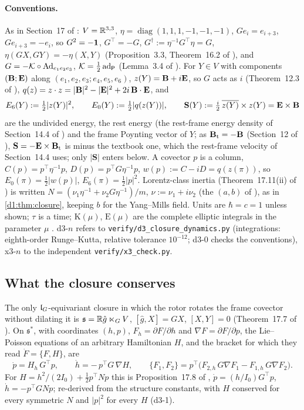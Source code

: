 \paragraph{Conventions.} As in Section~17 of \cite{ES17}: $V=\mathbb{R}^{3,3}$, $\eta=\operatorname{diag}(1,1,1,-1,-1,-1)$, $Ge_i=e_{i+3}$, $Ge_{i+3}=-e_i$,
so $G^2=-\mathbf 1$, $G^{\!\top}=-G$, $G^\dagger:=\eta^{-1}G^{\!\top}\eta=G$, $\eta(GX,GY)=-\eta(X,Y)$ (Proposition~3.3, Theorem~16.2 of \cite{ES17}), and
$G=-\mathcal K\circ\operatorname{Ad}_{e_1e_2e_3}$, $\mathcal K=\tfrac12\operatorname{ad}_{\mathsf P}$ (Lemma~3.4 of \cite{ES17}). For $Y\in V$ with components $(\mathbf B;\mathbf E)$ along
$(e_1,e_2,e_3;e_4,e_5,e_6)$, $z(Y)=\mathbf B+i\mathbf E$, so $G$ acts as $i$ (Theorem~12.3 of \cite{ES17}), $q(z)=z\cdot z=|\mathbf B|^2-|\mathbf E|^2+2i\,\mathbf B\cdot\mathbf E$, and
\[
E_6(Y):=\tfrac12|z(Y)|^2,\qquad E_0(Y):=\tfrac12|q(z(Y))|,\qquad \mathbf S(Y):=\tfrac i2\,\overline{z(Y)}\times z(Y)=\mathbf E\times\mathbf B
\]
are the undivided energy, the rest energy (the rest-frame energy density of Section~14.4 of \cite{ES17}) and the frame Poynting vector of $Y$; as
$\mathbf B_{\rm t}=-\mathbf B$ (Section~12 of \cite{ES17}), $\mathbf S=-\mathbf E\times\mathbf B_{\rm t}$ is minus the textbook one, which the rest-frame velocity of Section~14.4 uses;
only $|\mathbf S|$ enters below. A covector $p$ is a column, $C(p)=p^{\!\top}\eta^{-1}p$, $D(p)=p^{\!\top}G\eta^{-1}p$, $w(p):=C-iD=q(z(\pi))$, so
$E_0(\pi)=\tfrac12|w(p)|$, $E_6(\pi)=\tfrac12|p|^2$. Lorentz-class inertia (Theorem~17.11(ii) of \cite{ES17}) is written
$N=(\nu_1\eta^{-1}+\nu_2G\eta^{-1})/m$, $\nu:=\nu_1+i\nu_2$ (the $(a,b)$ of \cite{ES17}), as in \cref{d1:thm:closure}, keeping $b$ for the Yang--Mills
field. Units are $\hbar=c=1$ unless shown; $\tau$ is a time; $\mathrm K(\mu)$, $\mathrm E(\mu)$ are the complete elliptic integrals in the parameter $\mu$
\cite{DLMF}. d3-$n$ refers to \texttt{verify/d3\_closure\_dynamics.py} (integrations: eighth-order Runge--Kutta, relative tolerance $10^{-12}$; d3-0
checks the conventions), x3-$n$ to the independent \texttt{verify/x3\_check.py}.

\subsection{What the closure conserves}
\label{d3:sec:conserve}

The only $\mathfrak l_G$-equivariant closure in which the rotor rotates the frame covector without dilating it is $\mathfrak s=\mathbb{R}\hat g\ltimes_GV$,
$[\hat g,X]=GX$, $[X,Y]=0$ (Theorem~17.7 of \cite{ES17}). On $\mathfrak s^*$, with coordinates $(h,p)$, $F_h=\partial F/\partial h$ and
$\nabla F=\partial F/\partial p$, the Lie--Poisson equations of an arbitrary Hamiltonian $H$, and the bracket for which they read $\dot F=\{F,H\}$, are
\begin{equation}
\label{d3:eq:LPgen}
\dot p=H_h\,G^{\!\top}p,\qquad \dot h=-\,p^{\!\top}G\,\nabla H,\qquad
\{F_1,F_2\}=p^{\!\top}\bigl(F_{2,h}\,G\nabla F_1-F_{1,h}\,G\nabla F_2\bigr).
\end{equation}
For $H=h^2/(2I_0)+\tfrac12p^{\!\top}Np$ this is Proposition~17.8 of \cite{ES17}, $\dot p=(h/I_0)G^{\!\top}p$, $\dot h=-p^{\!\top}GNp$; re-derived from the
structure constants, with $H$ conserved for every symmetric $N$ and $|p|^2$ for every $H$ (d3-1).

